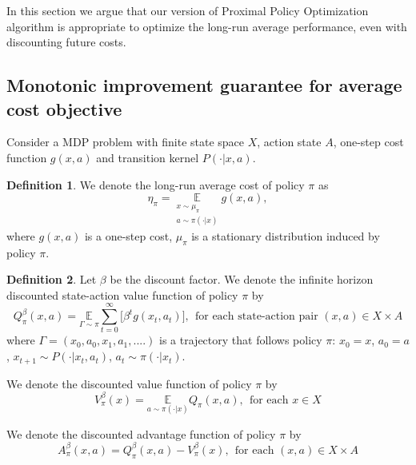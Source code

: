 \documentclass[11pt]{article}
\newcommand{\E}{\mathbb{E}}
\theoremstyle{definition}
\numberwithin{equation}{section}
\newtheorem{definition}{Definition}
\begin{document}
In this section we  argue that our version of Proximal Policy Optimization algorithm is appropriate to optimize  the long-run average performance, even with discounting  future costs.

\subsection{Monotonic improvement guarantee for average cost objective}\label{sec:TRPOforAC}






Consider a MDP problem with finite state space $X$, action state $A$, one-step cost function $g(x,a)$ and transition kernel $P(\cdot|x, a)$.


\begin{definition}

We denote the long-run average cost  of policy $\pi$ as
\begin{equation}
\eta_\pi = \underset{\substack{x\sim \mu_\pi\\ a\sim \pi(\cdot|x)}}{\E} g(x,a),
\end{equation}
where  $g(x,a)$ is a one-step cost, $\mu_\pi$ is a stationary distribution induced by policy $\pi.$
\end{definition}

\begin{definition}
Let $\beta$ be the discount factor. We denote the infinite horizon discounted state-action value function of policy $\pi$ by
\begin{equation}
Q^\beta_\pi(x, a) = \underset{\Gamma \sim \pi}{\E}    \sum\limits_{t=0}^{\infty} \Big[ \beta^t g(x_t,a_t) \Big],~~\text{for each state-action pair }(x, a)\in X\times A
\end{equation}
where $\Gamma = (x_0, a_0, x_1, a_1,....)$  is a trajectory that follows policy $\pi$: $x_0 = x$, $a_0 = a$, $x_{t+1}\sim P(\cdot|x_t, a_t)$,  $a_t\sim \pi(\cdot|x_t)$.




We denote the discounted value function of policy $\pi$ by
\begin{equation}
V^\beta_\pi(x) = \underset{a\sim \pi(\cdot|x)}{\E} Q_\pi(x, a),~~\text{for each }x\in X
\end{equation}


We denote the discounted advantage function  of policy $\pi$ by
\begin{equation}
A^\beta_\pi(x, a) =  Q^\beta_\pi(x, a) -V^\beta_\pi(x),~~\text{for each }(x, a)\in X\times A
\end{equation}


\end{definition}
\end{document}
